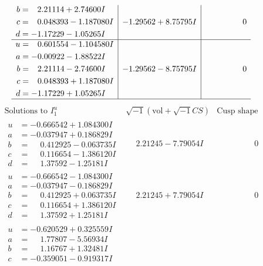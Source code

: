 \documentclass[1p]{elsarticle_modified}
\theoremstyle{definition}
\newcommand{\I}{\sqrt{-1}}
\begin{document}
$$\begin{array}{c|c|c}
\begin{aligned}
b &= \phantom{-}2.21114 + 2.74600 I \\
c &= \phantom{-}0.048393 - 1.187080 I \\
d &= -1.17229 - 1.05265 I\end{aligned}
 & -1.29562 + 8.75795 I & \phantom{-0.000000 } 0 \\ \hline\begin{aligned}
u &= \phantom{-}0.601554 - 1.104580 I \\
a &= -0.00922 - 1.88522 I \\
b &= \phantom{-}2.21114 - 2.74600 I \\
c &= \phantom{-}0.048393 + 1.187080 I \\
d &= -1.17229 + 1.05265 I\end{aligned}
 & -1.29562 - 8.75795 I & \phantom{-0.000000 } 0\\
 \hline 
 \end{array}$$\newpage$$\begin{array}{c|c|c}  
\text{Solutions to }I^u_{1}& \I (\text{vol} + \sqrt{-1}CS) & \text{Cusp shape}\\
 \hline 
\begin{aligned}
u &= -0.666542 + 1.084300 I \\
a &= -0.037947 + 0.186829 I \\
b &= \phantom{-}0.412925 - 0.063735 I \\
c &= \phantom{-}0.116654 - 1.386120 I \\
d &= \phantom{-}1.37592 - 1.25181 I\end{aligned}
 & \phantom{-}2.21245 - 7.79054 I & \phantom{-0.000000 } 0 \\ \hline\begin{aligned}
u &= -0.666542 - 1.084300 I \\
a &= -0.037947 - 0.186829 I \\
b &= \phantom{-}0.412925 + 0.063735 I \\
c &= \phantom{-}0.116654 + 1.386120 I \\
d &= \phantom{-}1.37592 + 1.25181 I\end{aligned}
 & \phantom{-}2.21245 + 7.79054 I & \phantom{-0.000000 } 0 \\ \hline\begin{aligned}
u &= -0.620529 + 0.325559 I \\
a &= \phantom{-}1.77807 - 5.56934 I \\
b &= \phantom{-}1.16767 + 1.32481 I \\
c &= -0.359051 - 0.919317 I \\

\end{aligned}
\end{array}$$
\end{document}
